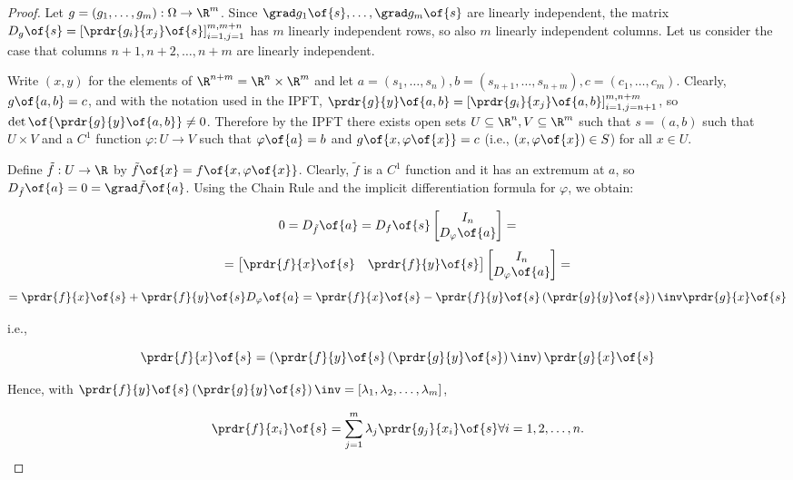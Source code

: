 \begin{proof}
    Let $g = (g_1, \dots, g_m): \Omega \to \R^m$. Since $\grad g_1\of{s}, \dots, \grad g_m\of{s}$ are linearly independent, the matrix $D_g\of{s} = \left[\prdr{g_i}{x_j}\of{s}\right]^{m, m+n}_{i=1, j=1}$ has $m$ linearly independent rows, so also $m$ linearly independent columns. Let us consider the case that columns $n + 1, n + 2, \dots, n + m$ are linearly independent.

    Write $(x,y)$ for the elements of $\R^{n+m} = \R^n \times \R^m$ and let $a = (s_1, \dots, s_n), b = (s_{n+1}, \dots, s_{n+m}), c = (c_1, \dots, c_m)$. Clearly, $g\of{a,b} = c$, and with the notation used in the IPFT, $\prdr{g}{y}\of{a,b} = \left[\prdr{g_i}{x_j}\of{a,b}\right]^{m, n+m}_{i=1,j=n+1}$, so $\det\of{\prdr{g}{y}\of{a,b}} \neq 0$. Therefore by the IPFT there exists open sets $U \subseteq \R^n, V \subseteq \R^m$ such that $s = (a,b)$ such that $U \times V$ and a $C^1$ function $\varphi: U \to V$ such that $\varphi\of{a} = b$ and $g\of{x, \varphi\of{x}} = c$ (i.e., $(x, \varphi\of{x}) \in S$) for all $x \in U$.

    Define $\tilde{f}: U \to \R$ by $\tilde{f}\of{x} = f\of{x, \varphi\of{x}}$. Clearly, $\tilde{f}$ is a $C^1$ function and it has an extremum at $a$, so $D_{\tilde{f}}\of{a} = 0 = \grad \tilde{f}\of{a}$. Using the Chain Rule and the implicit differentiation formula for $\varphi$, we obtain:

    \[0 = D_{\tilde{f}}\of{a} = D_f\of{s} \begin{bmatrix} I_n \\ D_\varphi\of{a} \end{bmatrix} =\]
    \[= \begin{bmatrix} \prdr{f}{x}\of{s} & \prdr{f}{y}\of{s} \end{bmatrix} \begin{bmatrix} I_n \\ D_\varphi\of{a} \end{bmatrix} =\]
    \[= \prdr{f}{x}\of{s} + \prdr{f}{y}\of{s} D_\varphi\of{a} = \prdr{f}{x}\of{s} - \prdr{f}{y}\of{s} \left(\prdr{g}{y}\of{s}\right)\inv \prdr{g}{x}\of{s}\]

    i.e.,

    \[\prdr{f}{x}\of{s} = \left(\prdr{f}{y}\of{s} \left(\prdr{g}{y}\of{s}\right)\inv\right) \prdr{g}{x}\of{s}\]

    Hence, with $\prdr{f}{y}\of{s} \left(\prdr{g}{y}\of{s}\right)\inv = \left[\lambda_1, \lambda_2, \dots, \lambda_m\right]$,

    \[\prdr{f}{x_i}\of{s} = \sum_{j=1}^{m} \lambda_j \prdr{g_j}{x_i}\of{s} \forall i = 1, 2, \dots, n.\]


\end{proof}
